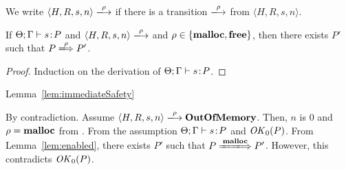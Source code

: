 We write \(\langle H, R, s, n \rangle \xlongrightarrow{\rho}\) if
there is a transition \(\xlongrightarrow{\rho}\) from \(\langle H, R,
s, n \rangle\).

\begin{lemma}
\label{lem:enabled}
If \(\Theta; \Gamma \vdash s \!:\! P\) and \(\langle H, R, s, n \rangle
\xlongrightarrow{\rho}\) and \(\rho \in \{\mathbf{malloc}, \mathbf{free}\}\), then
there exists \(P'\) such that \(P \xLongrightarrow{\rho} P'\).
\end{lemma}

\begin{proof}
Induction on the derivation of \(\Theta; \Gamma \vdash s \!:\! P\).
\end{proof}

\begin{pfof}{Lemma~\ref{lem:immediateSafety}}

By contradiction.  Assume \(\langle H, R, s, n \rangle
\xlongrightarrow{\rho} \OVERFLOW\). Then, \(n\) is \(0\) and \(\rho =
\mathbf{malloc}\) from .  From the assumption \(\Theta;\Gamma
\vdash s \!:\! P\) and \(\mathit{OK}_0(P)\).  From Lemma~\ref{lem:enabled},
there exists \(P'\) such that \(P \xLongrightarrow{\Malloc} P'\).
However, this contradicts \(\mathit{OK}_0(P)\).


\end{pfof}


